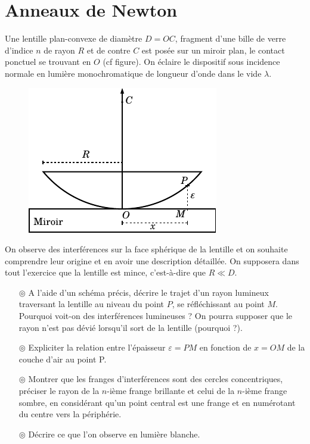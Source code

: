 \documentclass{report}
\begin{document}
\newpage

\section*{Anneaux de Newton}

Une lentille plan-convexe de diamètre $D=OC$, fragment d'une bille de verre d'indice $n$ de rayon $R$ et de contre $C$ est posée sur un miroir plan, le contact ponctuel se trouvant en $O$ (cf figure). On éclaire le dispositif sous incidence normale en lumière monochromatique de longueur d'onde dans le vide $\lambda$.

\begin{figure}[h]
\centering
  \includegraphics[scale=1.2]{newton.pdf}
\end{figure}

On observe des interférences sur la face sphérique de la lentille et on souhaite comprendre leur origine et en avoir une description détaillée. On supposera dans tout l'exercice que la lentille est mince, c'est-à-dire que $R\ll D$. 

\begin{itemize}

	\item[$\circledcirc$] A l'aide d'un schéma précis, décrire le trajet d'un rayon lumineux traversant la lentille au niveau du point $P$, se réfléchissant au point $M$. Pourquoi voit-on des interférences lumineuses ? On pourra supposer que le rayon n'est pas dévié lorsqu'il sort de la lentille (pourquoi ?).
	
	\item[$\circledcirc$] Expliciter la relation entre l'épaisseur $\varepsilon=PM$ en fonction de $x=OM$ de la couche d'air au point P. 
	
	\item[$\circledcirc$] Montrer que les franges d'interférences sont des cercles concentriques, préciser le rayon de la $n$-ième frange brillante et celui de la $n$-ième frange sombre, en considérant qu'un point central est une frange et en numérotant du centre vers la périphérie.
	
	\item[$\circledcirc$] Décrire ce que l'on observe en lumière blanche.

\end{itemize}
\end{document}

